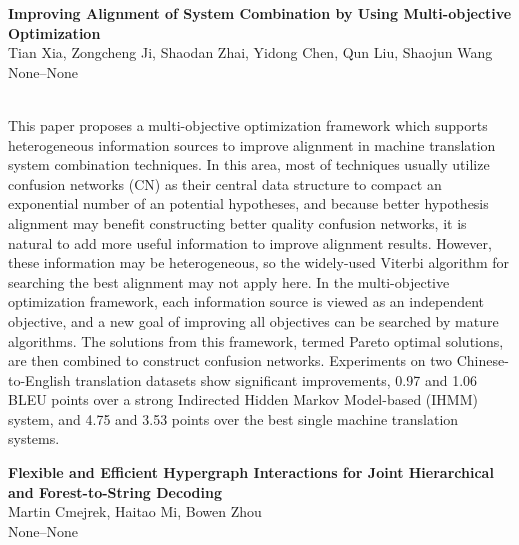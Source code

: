 \documentclass[twoside,makeidx]{book}
\renewcommand{\normalsize}{\fontsize{8}{9}\selectfont}
\renewcommand{\small}{\fontsize{7}{8}\selectfont}
\begin{document}
\par\vspace{2em}\noindent%
\begin{minipage}{\linewidth}%
\begin{center}
\textbf{\normalsize Improving Alignment of System Combination by Using Multi-objective Optimization}\\
\normalsize  Tian Xia,  Zongcheng Ji,  Shaodan Zhai,  Yidong Chen,  Qun Liu,  Shaojun Wang\\
{\small None--None}\\
\end{center}
\end{minipage}\\[0.5em]
\nopagebreak%
\noindent%
{\small This paper proposes a multi-objective optimization framework which supports heterogeneous information sources to improve alignment in machine translation system combination techniques. In this area, most of techniques usually utilize confusion networks (CN) as their central data structure to compact an exponential number of an potential hypotheses, and because better hypothesis alignment may benefit constructing better quality confusion networks, it is natural to add more useful information to improve alignment results. However, these information may be heterogeneous, so the widely-used Viterbi algorithm for searching the best alignment may not apply here. In the multi-objective optimization framework, each information source is viewed as an independent objective, and a new goal of improving all objectives can be searched by mature algorithms. The solutions from this framework, termed Pareto optimal solutions, are then combined to construct confusion networks. Experiments on two Chinese-to-English translation datasets show significant improvements, 0.97 and 1.06 BLEU points over a strong Indirected Hidden Markov Model-based (IHMM) system, and 4.75 and 3.53 points over the best single machine translation systems.}
\par\vspace{2em}\noindent%
\begin{minipage}{\linewidth}%
\begin{center}
\textbf{\normalsize Flexible and Efficient Hypergraph Interactions for Joint Hierarchical and Forest-to-String Decoding}\\
\normalsize  Martin Cmejrek,  Haitao Mi,  Bowen Zhou\\
{\small None--None}\\
\end{center}
\end{minipage}\\[0.5em]
\end{document}
